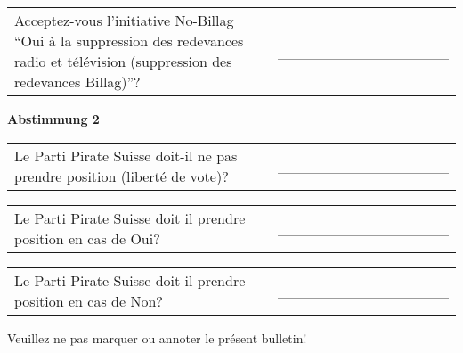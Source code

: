 \documentclass[11pt, a4paper]{scrartcl}
\begin{document}
{\begin{minipage}[t][12.5cm][t]{\textwidth}
\begin{tabular}{ b{13.5cm} b{3cm} }
Acceptez-vous l'initiative No-Billag \enquote{Oui à la suppression des redevances radio et télévision (suppression des redevances Billag)}?
& \_\_\_\_\_\_\_\_\_\_\_\_\_\_\_\_ \\
\end{tabular}

\vspace{0.5cm}

\textbf{Abstimmung 2}

\vspace{0.5cm}

\begin{tabular}{ b{13.5cm} b{3cm} }
Le Parti Pirate Suisse doit-il ne pas prendre position (liberté de vote)?
& \_\_\_\_\_\_\_\_\_\_\_\_\_\_\_\_ \\
\end{tabular}

\vspace{0.5cm}

\begin{tabular}{ b{13.5cm} b{3cm} }
Le Parti Pirate Suisse doit il prendre position en cas de Oui?
& \_\_\_\_\_\_\_\_\_\_\_\_\_\_\_\_ \\
\end{tabular}

\vspace{0.5cm}

\begin{tabular}{ b{13.5cm} b{3cm} }
Le Parti Pirate Suisse doit il prendre position en cas de Non?
& \_\_\_\_\_\_\_\_\_\_\_\_\_\_\_\_ \\
\end{tabular}

\vspace{0.5cm}

Veuillez ne pas marquer ou annoter le présent bulletin!


\end{minipage}


}
\end{document}
